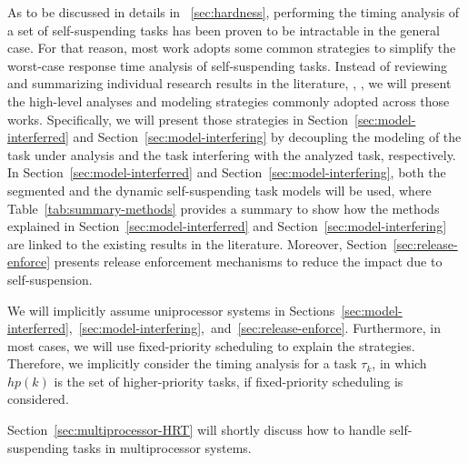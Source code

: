 As to be discussed in details in \mysectionref{}~\ref{sec:hardness}, performing the timing analysis of a set of self-suspending tasks has been proven to be intractable in the general case. For that reason, most work adopts some common strategies to simplify the worst-case response time analysis of self-suspending tasks. Instead of reviewing and summarizing individual research results in the literature, \eg, \cite{Raj:suspension1991,RTCSA-KimCPKH95,MingLiRTCSA1994,PH:rtss98,ECRTS-AudsleyB04,RTAS-AudsleyB04,RTCSA-BletsasA05,LR:rtas10,RTSS-KimANR13,LiuChen:rtss2014,huangpass:dac2015,Huang:multiseg,WC16-suspend-DATE}, we will present the high-level analyses and modeling strategies commonly adopted across those works. Specifically, we will present those strategies in Section~\ref{sec:model-interferred} and Section~\ref{sec:model-interfering} by decoupling the modeling of the task under analysis and the task interfering with the analyzed task, respectively. In Section~\ref{sec:model-interferred} and Section~\ref{sec:model-interfering}, both the segmented and the dynamic self-suspending task models will be used, where Table~\ref{tab:summary-methods} provides a summary to show how the methods explained in Section~\ref{sec:model-interferred} and Section~\ref{sec:model-interfering} are linked to the existing results in the literature. 
Moreover, Section~\ref{sec:release-enforce} presents  release enforcement mechanisms to reduce the impact due to self-suspension. 

We will implicitly assume uniprocessor systems in Sections~\ref{sec:model-interferred},~\ref{sec:model-interfering},~and~\ref{sec:release-enforce}. 
Furthermore, in most cases, we will use fixed-priority scheduling to explain the strategies. Therefore, we implicitly consider the timing analysis for a task $\tau_k$, in which $hp(k)$ is the set of higher-priority tasks, if fixed-priority scheduling is considered. 

Section~\ref{sec:multiprocessor-HRT} will shortly discuss how to handle self-suspending tasks in multiprocessor systems.




